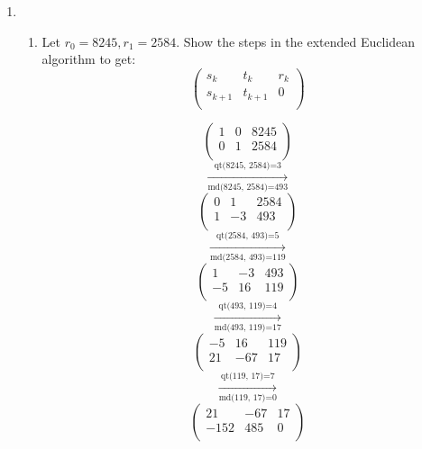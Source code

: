 \documentclass[11pt]{article}
\begin{document}
\begin{enumerate}
\newpage %
\item 
\begin{enumerate}
\item Let $r_0 = 8245, r_1 = 2584$.  Show the steps in the extended Euclidean algorithm to get:
\begin{equation*}
\left(
\begin{array}{ccc}
s_k & t_k & r_k \\
s_{k+1} & t_{k+1} & 0 \\
\end{array} \right)
\end{equation*}

\begin{equation*}
\left(
\begin{array}{ccc}
 1 & 0 & 8245 \\
 0 & 1 & 2584 \\
\end{array}
\right)
\end{equation*}
$$\xrightarrow[\text{md(8245, 2584)=493}]{\text{qt(8245, 2584)=3}}$$
\begin{equation*}
\left(
\begin{array}{ccc}
 0 & 1 & 2584 \\
 1 & -3 & 493 \\
\end{array}
\right)
\end{equation*}
$$\xrightarrow[\text{md(2584, 493)=119}]{\text{qt(2584, 493)=5}}$$
\begin{equation*}
\left(
\begin{array}{ccc}
 1 & -3 & 493 \\
 -5 & 16 & 119 \\
\end{array}
\right)
\end{equation*}
$$\xrightarrow[\text{md(493, 119)=17}]{\text{qt(493, 119)=4}}$$
\begin{equation*}
\left(
\begin{array}{ccc}
 -5 & 16 & 119 \\
 21 & -67 & 17 \\
\end{array}
\right)
\end{equation*}
$$\xrightarrow[\text{md(119, 17)=0}]{\text{qt(119, 17)=7}}$$
\begin{equation*}
\left(
\begin{array}{ccc}
 21 & -67 & 17 \\
 -152 & 485 & 0 \\
\end{array}
\right)
\end{equation*}


\end{enumerate}
\end{enumerate}
\end{document}
